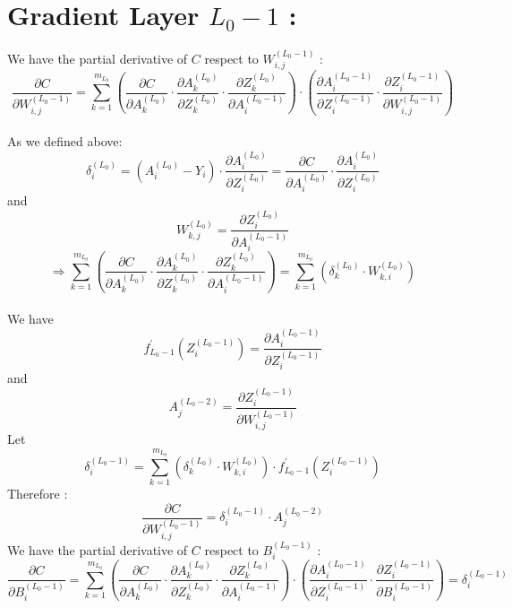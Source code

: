 \documentclass{article}
\begin{document}
    \section*{Gradient Layer $L_0 - 1$ :}
    We have the partial derivative of $C$ respect to $W^{(L_0 - 1)}_{i, j}$ : 
    \[
        \frac{\partial C}{\partial W^{(L_0-1)}_{i, j}} = 
        \sum_{k = 1}^{m_{L_0}} \left( 
            \frac{\partial C}{\partial A^{(L_0)}_k} \cdot
            \frac{\partial A^{(L_0)}_k}{\partial Z^{(L_0)}_k} \cdot
            \frac{\partial Z^{(L_0)}_k}{\partial A^{(L_0 - 1)}_i}
        \right) \cdot
        \left(
            \frac{\partial A^{(L_0 - 1)}_i}{\partial Z^{(L_0 - 1)}_i} \cdot
             \frac{\partial Z^{(L_0 - 1)}_i}{\partial W^{(L_0 - 1)}_{i, j}}
        \right)
    \]  
    \\
    As we defined above:
    \[
        \delta^{(L_0)}_i = 
        (A^{(L_0)}_i - Y_i) \cdot \frac{\partial A^{(L_0)}_{i}}{\partial Z^{(L_0)}_i} = 
        \frac{\partial C}{\partial A^{(L_0)}_{i}} \cdot
        \frac{\partial A^{(L_0)}_{i}}{\partial Z^{(L_0)}_i}
    \]
    and
    \[
        W^{(L_0)}_{k, j} = \frac{\partial Z^{(L_0)}_i}{\partial A^{(L_0 - 1)}_{i}} 
    \]
    \[
        \Rightarrow \sum_{k = 1}^{m_{L_0}} \left( 
            \frac{\partial C}{\partial A^{(L_0)}_k} \cdot
            \frac{\partial A^{(L_0)}_k}{\partial Z^{(L_0)}_k} \cdot
            \frac{\partial Z^{(L_0)}_k}{\partial A^{(L_0 - 1)}_i}
        \right) = 
        \sum_{k = 1}^{m_{L_0}}\left(
            \delta^{(L_0)}_k \cdot W^{(L_0)}_{k, i}
        \right)
    \]
    \\
    We have 
    \[
        f_{L_0 - 1}^{\prime}\left(Z^{(L_0 - 1)}_i\right) =
        \frac{\partial A^{(L_0 - 1)}_i}{\partial Z^{(L_0 - 1)}_i}
    \]
    and 
    \[
        A^{(L_0-2)}_j = \frac{\partial Z^{(L_0 - 1)}_i}{\partial W^{(L_0 - 1)}_{i, j}}
    \]
    Let 
    \[
        \delta^{(L_0 - 1)}_i = \sum_{k = 1}^{m_{L_0}}\left(
            \delta^{(L_0)}_k \cdot W^{(L_0)}_{k, i}
        \right) \cdot f_{L_0 - 1}^{\prime}\left(Z^{(L_0 - 1)}_i\right)
    \]
    Therefore :
    \[
        \frac{\partial C}{\partial W^{(L_0-1)}_{i, j}} = 
        \delta^{(L_0 - 1)}_i \cdot
        A^{(L_0-2)}_j
    \]
    We have the partial derivative of $C$ respect to $B^{(L_0 - 1)}_{i}$ :
    \[
        \frac{\partial C}{\partial B^{(L_0-1)}_{i}} = 
        \sum_{k = 1}^{m_{L_0}} \left( 
            \frac{\partial C}{\partial A^{(L_0)}_k} \cdot
            \frac{\partial A^{(L_0)}_k}{\partial Z^{(L_0)}_k} \cdot
            \frac{\partial Z^{(L_0)}_k}{\partial A^{(L_0 - 1)}_i}
        \right) \cdot
        \left(
            \frac{\partial A^{(L_0 - 1)}_i}{\partial Z^{(L_0 - 1)}_i} \cdot
             \frac{\partial Z^{(L_0 - 1)}_i}{\partial B^{(L_0 - 1)}_{i}}
        \right) = \delta^{(L_0 - 1)}_i
    \]  
\end{document}
